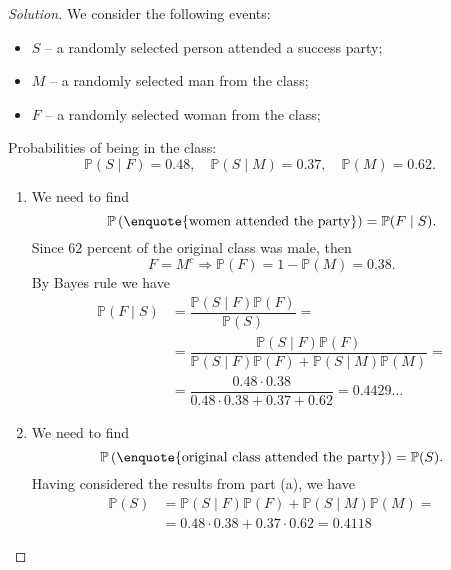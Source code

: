 \documentclass{article}[12pt]
\newenvironment{solution}
  {\renewcommand\qedsymbol{$\blacksquare$}\begin{proof}[Solution]}
  {\end{proof}}
\begin{document}
\begin{solution}
We consider the following events:
\begin{itemize}
    \item $S$ -- a randomly selected person attended a success party;
    \item $M$ -- a randomly selected man from the class;
    \item $F$ -- a randomly selected woman from the class;
\end{itemize}
Probabilities of being in the class:
\begin{equation*}
    \mathbb{P}(S\mid F) = 0.48,\quad\mathbb{P}(S\mid M) = 0.37,\quad\mathbb{P}(M) = 0.62.
\end{equation*}
\begin{enumerate}[label=(\alph*)]
    \item We need to find
    \begin{equation*}
        \mathbb{P}\left(\text{\enquote{women attended the party}}\right) = \mathbb{P}(F\mid S).
    \end{equation*}
    Since $62$ percent of the original class was male, then
    \begin{equation*}
        F = M^{c} \Longrightarrow\mathbb{P}(F) = 1 - \mathbb{P}(M) = 0.38.
    \end{equation*}
    By Bayes rule we have
    \begin{align*}
        \mathbb{P}(F\mid S) &= \dfrac{\mathbb{P}(S\mid F)\mathbb{P}(F)}{\mathbb{P}(S)} = 
        \\
        & = \dfrac{\mathbb{P}(S\mid F)\mathbb{P}(F)}{\mathbb{P}(S\mid F)\mathbb{P}(F) + \mathbb{P}(S\mid M)\mathbb{P}(M)} =
        \\
        & = \dfrac{0.48\cdot 0.38}{0.48\cdot 0.38 + 0.37 + 0.62} = 0.4429\ldots
    \end{align*}
    
    \item We need to find 
    \begin{equation*}
        \mathbb{P}\left(\text{\enquote{original class attended the party}}\right) = \mathbb{P}(S).
    \end{equation*}
    Having considered the results from part (a), we have
    \begin{align*}
        \mathbb{P}(S) &= \mathbb{P}(S\mid F)\mathbb{P}(F) + \mathbb{P}(S\mid M)\mathbb{P}(M) = 
        \\
        & = 0.48\cdot 0.38 + 0.37\cdot 0.62 = 0.4118
    \end{align*}
\end{enumerate}
\end{solution}
\end{document}
